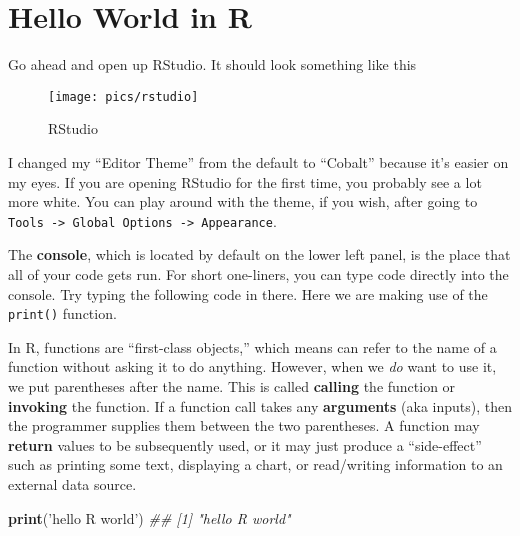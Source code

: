 \documentclass[12pt,krantz2]{krantz}
\makeatletter
\newenvironment{Shaded}{\begin{snugshade}}{\end{snugshade}}
\newcommand{\CommentTok}[1]{\textcolor[rgb]{0.37,0.37,0.37}{\textit{#1}}}
\newcommand{\KeywordTok}[1]{\textcolor[rgb]{0.27,0.27,0.27}{\textbf{#1}}}
\newcommand{\NormalTok}[1]{#1}
\newcommand{\StringTok}[1]{\textcolor[rgb]{0.5,0.5,0.5}{#1}}
\newenvironment{kframe}{%
\medskip{}
\setlength{\fboxsep}{.8em}
 \def\at@end@of@kframe{}%
 \ifinner\ifhmode%
  \def\at@end@of@kframe{\end{minipage}}%
  \begin{minipage}{\columnwidth}%
 \fi\fi%
 \def\FrameCommand##1{\hskip\@totalleftmargin \hskip-\fboxsep
 \colorbox{shadecolor}{##1}\hskip-\fboxsep
     \hskip-\linewidth \hskip-\@totalleftmargin \hskip\columnwidth}%
 \MakeFramed {\advance\hsize-\width
   \@totalleftmargin\z@ \linewidth\hsize
   \@setminipage}}%
 {\par\unskip\endMakeFramed%
 \at@end@of@kframe}
\renewenvironment{Shaded}{\begin{kframe}}{\end{kframe}}
\makeatother
\begin{document}
\hypertarget{hello-world-in-r}{%
\section{Hello World in R}\label{hello-world-in-r}}

Go ahead and open up RStudio. It should look something like this

\begin{figure}

{\centering \texttt{[image: pics/rstudio]} 

}

\caption{RStudio}\label{fig:rstudio}
\end{figure}

I changed my ``Editor Theme'' from the default to ``Cobalt'' because it's easier on my eyes. If you are opening RStudio for the first time, you probably see a lot more white. You can play around with the theme, if you wish, after going to \texttt{Tools\ -\textgreater{}\ Global\ Options\ -\textgreater{}\ Appearance}.

The \textbf{console}, which is located by default on the lower left panel, is the place that all of your code gets run. For short one-liners, you can type code directly into the console. Try typing the following code in there. Here we are making use of the \texttt{print()} function.

\begin{rmd-details}
In R, functions are ``first-class objects,'' which means can refer to the name of a function without asking it to do anything. However, when we \emph{do} want to use it, we put parentheses after the name. This is called \textbf{calling} the function or \textbf{invoking} the function. If a function call takes any \textbf{arguments} (aka inputs), then the programmer supplies them between the two parentheses. A function may \textbf{return} values to be subsequently used, or it may just produce a ``side-effect'' such as printing some text, displaying a chart, or read/writing information to an external data source.

\end{rmd-details}

\begin{Shaded}
\begin{Highlighting}[]
\KeywordTok{print}\NormalTok{(}\StringTok{'hello R world'}\NormalTok{)}
\CommentTok{## [1] "hello R world"}
\end{Highlighting}
\end{Shaded}
\end{document}
